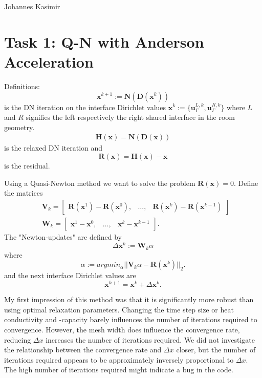 \documentclass[]{article}
\begin{document}
Johannes Kasimir

\section*{Task 1: Q-N with Anderson Acceleration}

Definitions:
\begin{equation}
    \mathbf{x}^{k+1} := \mathbf{N}(\mathbf{D}(\mathbf{x}^k))
\end{equation}
is the DN iteration on the interface Dirichlet values $\mathbf{x}^k := \{\mathbf{u}_\Gamma^{L,k}, \mathbf{u}_\Gamma^{R,k} \}$ where $L$ and $R$ signifies the left respectively the right shared interface in the room geometry.
\begin{align}
    \mathbf{H}(\mathbf{x}) = \mathbf{N}(\mathbf{D}(\mathbf{x}))
\end{align}
is the relaxed DN iteration and
\begin{equation}
    \mathbf{R}(\mathbf{x}) = \mathbf{H}(\mathbf{x}) - \mathbf{x}
\end{equation}
is the residual.

Using a Quasi-Newton method we want to solve the problem $\mathbf{R}(\mathbf{x})=0$.
Define the matrices
\begin{align}
    &\mathbf{V}_k = \begin{bmatrix}
        \mathbf{R}(\mathbf{x}^1) - \mathbf{R}(\mathbf{x}^0), &
         \ldots, &
         \mathbf{R}(\mathbf{x}^k) - \mathbf{R}(\mathbf{x}^{k-1})
    \end{bmatrix} \\
    &\mathbf{W}_k = \begin{bmatrix}
    \mathbf{x}^1 - \mathbf{x}^0, &
    \ldots, &
    \mathbf{x}^k - \mathbf{x}^{k-1}
    \end{bmatrix}.
\end{align}
The "Newton-updates" are defined by
\begin{equation}
    \Delta\mathbf{x}^k := \mathbf{W}_k \alpha
\end{equation}
where
\begin{equation}
    \alpha := argmin_\alpha || \mathbf{V}_k \alpha - \mathbf{R}(\mathbf{x}^k) ||_2.
\end{equation}
and the next interface Dirichlet values are
\begin{equation}
    \mathbf{x}^{k+1} = \mathbf{x}^k + \Delta \mathbf{x}^k.
\end{equation}


My first impression of this method was that it is significantly more robust than using optimal relaxation parameters. Changing the time step size or heat conductivity and -capacity barely influences the number of iterations required to convergence. However, the mesh width does influence the convergence rate, reducing $\Delta x$ increases the number of iterations required. We did not investigate the relationship between the convergence rate and $\Delta x$ closer, but the number of iterations required appears to be approximately inversely proportional to $\Delta x$. The high number of iterations required might indicate a bug in the code.
\end{document}
